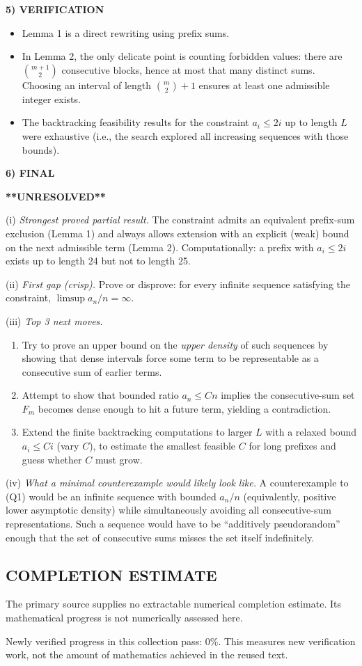 \medskip
\noindent\textbf{5) VERIFICATION}

\begin{itemize}
\item Lemma 1 is a direct rewriting using prefix sums.
\item In Lemma 2, the only delicate point is counting forbidden values: there are $\binom{m+1}{2}$ consecutive blocks, hence at most that many distinct sums.
Choosing an interval of length $\binom{m}{2}+1$ ensures at least one admissible integer exists.
\item The backtracking feasibility results for the constraint $a_i\le 2i$ up to length $L$ were exhaustive (i.e., the search explored all increasing sequences with those bounds).
\end{itemize}

\medskip
\noindent\textbf{6) FINAL}

\textbf{**UNRESOLVED**}

(i) \emph{Strongest proved partial result.} The constraint admits an equivalent prefix-sum exclusion (Lemma 1) and always allows extension with an explicit (weak) bound on the next admissible term (Lemma 2). Computationally: a prefix with $a_i\le 2i$ exists up to length 24 but not to length 25.

(ii) \emph{First gap (crisp).} Prove or disprove: for every infinite sequence satisfying the constraint, $\limsup a_n/n=\infty$.

(iii) \emph{Top 3 next moves.}
\begin{enumerate}
\item Try to prove an upper bound on the \emph{upper density} of such sequences by showing that dense intervals force some term to be representable as a consecutive sum of earlier terms.
\item Attempt to show that bounded ratio $a_n\le Cn$ implies the consecutive-sum set $F_m$ becomes dense enough to hit a future term, yielding a contradiction.
\item Extend the finite backtracking computations to larger $L$ with a relaxed bound $a_i\le C i$ (vary $C$), to estimate the smallest feasible $C$ for long prefixes and guess whether $C$ must grow.
\end{enumerate}

(iv) \emph{What a minimal counterexample would likely look like.} A counterexample to (Q1) would be an infinite sequence with bounded $a_n/n$ (equivalently, positive lower asymptotic density) while simultaneously avoiding all consecutive-sum representations. Such a sequence would have to be ``additively pseudorandom'' enough that the set of consecutive sums misses the set itself indefinitely.




\subsection*{COMPLETION ESTIMATE}
The primary source supplies no extractable numerical completion estimate. Its mathematical progress is not numerically assessed here.

Newly verified progress in this collection pass: $0\%$. This measures new verification work, not the amount of mathematics achieved in the reused text.
